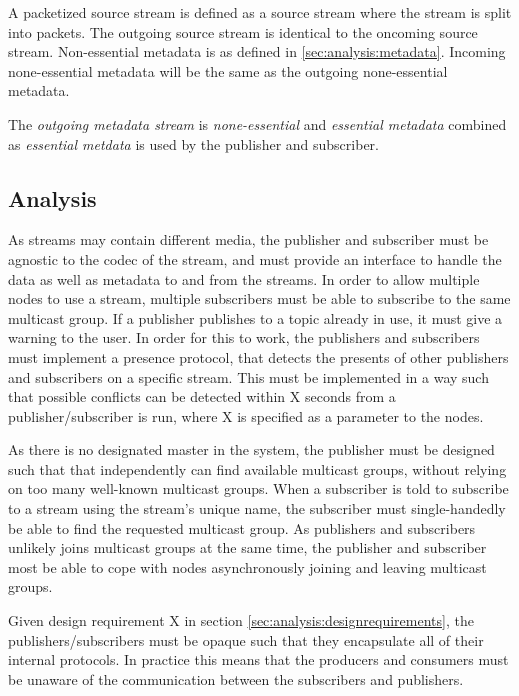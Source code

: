 A packetized source stream is defined as a source stream where the stream is split into packets.
The outgoing source stream is identical to the oncoming source stream.
Non-essential metadata is as defined in \ref{sec:analysis:metadata}. Incoming none-essential metadata will be the same as the outgoing none-essential metadata.

The \textit{outgoing metadata stream} is \textit{none-essential} and \textit{essential metadata} combined as \textit{essential metdata} is used by the publisher and subscriber.

\subsection{Analysis}
As streams may contain different media, the publisher and subscriber must be agnostic to the codec of the stream, and must provide an interface to handle the data as well as metadata to and from the streams.
In order to allow multiple nodes to use a stream, multiple subscribers must be able to subscribe to the same multicast group. If a publisher publishes to a topic already in use, it must give a warning to the user. In order for this to work, the publishers and subscribers must implement a presence protocol, that detects the presents of other publishers and subscribers on a specific stream. This must be implemented in a way such that possible conflicts can be detected within X seconds from a publisher/subscriber is run, where X is specified as a parameter to the nodes.

As there is no designated master in the system, the publisher must be designed such that that independently can find available multicast groups, without relying on too many well-known multicast groups. When a subscriber is told to subscribe to a stream using the stream's unique name, the subscriber must single-handedly be able to find the requested multicast group.
As publishers and subscribers unlikely joins multicast groups at the same time, the publisher and subscriber most be able to cope with nodes asynchronously joining and leaving multicast groups.

Given design requirement X in section \ref{sec:analysis:designrequirements}, the publishers/subscribers must be opaque such that they encapsulate all of their internal protocols. In practice this means that the producers and consumers must be unaware of the communication between the subscribers and publishers.


